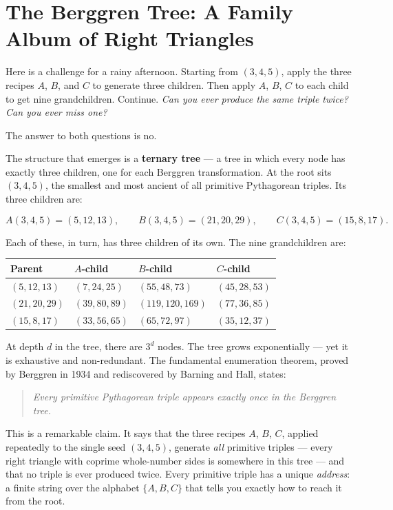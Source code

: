 \section{The Berggren Tree: A Family Album of Right Triangles}


Here is a challenge for a rainy afternoon. Starting from $(3, 4, 5)$, apply the three recipes $A$, $B$, and $C$ to generate three children. Then apply $A$, $B$, $C$ to each child to get nine grandchildren. Continue. \textit{Can you ever produce the same triple twice? Can you ever miss one?}

The answer to both questions is no.

The structure that emerges is a \textbf{ternary tree} --- a tree in which every node has exactly three children, one for each Berggren transformation. At the root sits $(3, 4, 5)$, the smallest and most ancient of all primitive Pythagorean triples. Its three children are:

\[
A(3,4,5) = (5, 12, 13), \qquad B(3,4,5) = (21, 20, 29), \qquad C(3,4,5) = (15, 8, 17).
\]

Each of these, in turn, has three children of its own. The nine grandchildren are:

\begin{center}
\small
\begin{tabular}{llll}
\toprule
Parent & $A$-child & $B$-child & $C$-child \\
\midrule
$(5, 12, 13)$ & $(7, 24, 25)$ & $(55, 48, 73)$ & $(45, 28, 53)$ \\
$(21, 20, 29)$ & $(39, 80, 89)$ & $(119, 120, 169)$ & $(77, 36, 85)$ \\
$(15, 8, 17)$ & $(33, 56, 65)$ & $(65, 72, 97)$ & $(35, 12, 37)$ \\
\bottomrule
\end{tabular}
\end{center}


At depth $d$ in the tree, there are $3^d$ nodes. The tree grows exponentially --- yet it is exhaustive and non-redundant. The fundamental enumeration theorem, proved by Berggren in 1934 and rediscovered by Barning and Hall, states:

\begin{quote}
\textit{Every primitive Pythagorean triple appears exactly once in the Berggren tree.}
\end{quote}

This is a remarkable claim. It says that the three recipes $A$, $B$, $C$, applied repeatedly to the single seed $(3, 4, 5)$, generate \textit{all} primitive triples --- every right triangle with coprime whole-number sides is somewhere in this tree --- and that no triple is ever produced twice. Every primitive triple has a unique \textit{address}: a finite string over the alphabet $\{A, B, C\}$ that tells you exactly how to reach it from the root.

